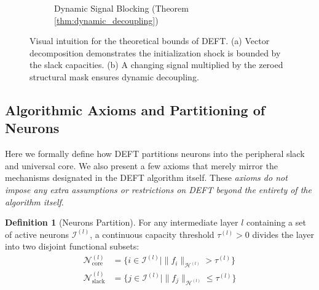\documentclass[11pt, a4paper, copyright, gdm]{google}
\newcommand{\calH}{\mathcal{H}}
\newcommand{\calI}{\mathcal{I}}
\newcommand{\calN}{\mathcal{N}}
\theoremstyle{definition}
\newtheorem{definition}{Definition}[section]
\begin{document}
\begin{figure}[htbp]
\begin{subfigure}{0.48\textwidth}
    \caption{Dynamic Signal Blocking (Theorem \ref{thm:dynamic_decoupling})}
\end{subfigure}
\caption{Visual intuition for the theoretical bounds of DEFT. (a) Vector decomposition demonstrates the initialization shock is bounded by the slack capacities. (b) A changing signal multiplied by the zeroed structural mask ensures dynamic decoupling.}
\label{fig:deft_proofs}
\end{figure}

\subsection{Algorithmic Axioms and Partitioning of Neurons}

Here we formally define how DEFT partitions neurons into the peripheral slack and universal core. We also present a few axioms that merely mirror the mechanisms designated in the DEFT algorithm itself. These \textit{axioms do not impose any extra assumptions or restrictions on DEFT beyond the entirety of the algorithm itself}.

\begin{definition}[Neurons Partition]
\label{def:subset_partition}
For any intermediate layer $l$ containing a set of active neurons $\calI^{(l)}$, a continuous capacity threshold $\tau^{(l)} > 0$ divides the layer into two disjoint functional subsets:
\begin{align}
    \calN^{(l)}_{\text{core}}   &= \{i \in \calI^{(l)} \mid \|f_i\|_{\calH^{(l)}} > \tau^{(l)}\} \\
    \calN^{(l)}_{\text{slack}}  &= \{j \in \calI^{(l)} \mid \|f_j\|_{\calH^{(l)}} \le \tau^{(l)}\}
\end{align}
\end{definition}
\end{document}
